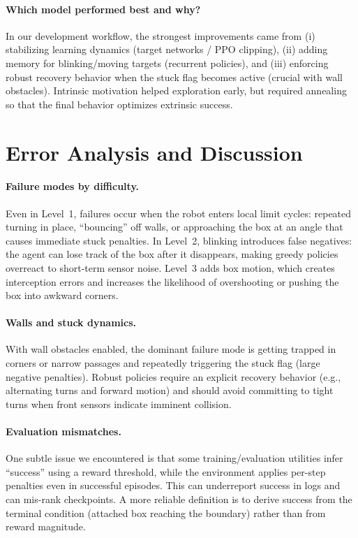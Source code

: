 \documentclass[11pt, oneside]{article}    %
\begin{document}
\paragraph{Which model performed best and why?}
In our development workflow, the strongest improvements came from (i) stabilizing learning dynamics (target networks / PPO clipping), (ii) adding memory for blinking/moving targets (recurrent policies), and (iii) enforcing robust recovery behavior when the stuck flag becomes active (crucial with wall obstacles). Intrinsic motivation helped exploration early, but required annealing so that the final behavior optimizes extrinsic success.

\section{Error Analysis and Discussion}
\paragraph{Failure modes by difficulty.}
Even in Level~1, failures occur when the robot enters local limit cycles: repeated turning in place, ``bouncing'' off walls, or approaching the box at an angle that causes immediate stuck penalties. In Level~2, blinking introduces false negatives: the agent can lose track of the box after it disappears, making greedy policies overreact to short-term sensor noise. Level~3 adds box motion, which creates interception errors and increases the likelihood of overshooting or pushing the box into awkward corners.

\paragraph{Walls and stuck dynamics.}
With wall obstacles enabled, the dominant failure mode is getting trapped in corners or narrow passages and repeatedly triggering the stuck flag (large negative penalties). Robust policies require an explicit recovery behavior (e.g., alternating turns and forward motion) and should avoid committing to tight turns when front sensors indicate imminent collision.

\paragraph{Evaluation mismatches.}
One subtle issue we encountered is that some training/evaluation utilities infer ``success'' using a reward threshold, while the environment applies per-step penalties even in successful episodes. This can underreport success in logs and can mis-rank checkpoints. A more reliable definition is to derive success from the terminal condition (attached box reaching the boundary) rather than from reward magnitude.
\end{document}
